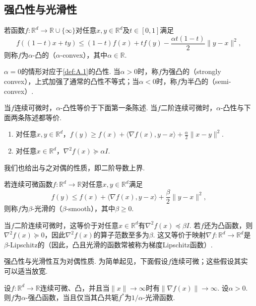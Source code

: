 \subsection{强凸性与光滑性}\label{sec:A.2}

\begin{definition}\label{def:A.7}
若函数$f:\mathbb R^d\to\mathbb R\cup\{\infty\}$对任意$x,y\in\mathbb R^d$及$t\in[0,1]$满足
$$
f((1-t)x+ty)\leq(1-t)f(x)+tf(y)-\frac{\alpha t(1-t)}2\|y-x\|^2,
$$
则称$f$为$\alpha$-凸的（$\alpha$-convex），其中$\alpha\in\mathbb R$.
\end{definition}
$\alpha=0$的情形对应于\autoref{def:A.1}的凸性. 当$\alpha>0$时，称$f$为强凸的（strongly convex），上式加强了通常的凸性不等式；当$\alpha<0$时，称$f$为半凸的（semi-convex）.

当$f$连续可微时，$\alpha$-凸性等价于下面第一条陈述. 当$f$二阶连续可微时，$\alpha$-凸性与下面两条陈述都等价.
\begin{enumerate}
\item 对任意$x,y\in\mathbb R^d$，$f(y)\geq f(x)+\langle\nabla f(x),y-x\rangle+\frac\alpha2\|x-y\|^2$.
\item 对任意$x\in\mathbb R^d$，$\nabla^2f(x)\succeq\alpha I$.
\end{enumerate}
我们也给出与之对偶的性质，即二阶导数上界.

\begin{definition}\label{def:A.8}
若连续可微函数$f:\mathbb R^d\to\mathbb R$对任意$x,y\in\mathbb R^d$满足
$$
f(y)\leq f(x)+\langle\nabla f(x),y-x\rangle+\frac\beta2\|y-x\|^2,
$$
则称$f$为$\beta$-光滑的（$\beta$-smooth），其中$\beta\geq0$.
\end{definition}

当$f$二阶连续可微时，这等价于对任意$x\in\mathbb R^d$有$\nabla^2f(x)\preceq\beta I$. 若$f$还为凸函数，则$\nabla^2f(x)\succeq0$，因此$\nabla^2f(x)$的算子范数至多为$\beta$. 这又等价于映射$\nabla f:\mathbb R^d\to\mathbb R^d$是$\beta$-Lipschitz的（因此，凸且光滑的函数常被称为梯度Lipschitz函数）.

强凸性与光滑性互为对偶性质. 为简单起见，下面假设$f$连续可微；这些假设其实可以适当放宽.

\begin{lemma}\label{lem:A.9}
设$f:\mathbb R^d\to\mathbb R$连续可微、凸，并且当$\|x\|\to\infty$时有$\|\nabla f(x)\|\to\infty$. 设$\alpha>0$. 则$f$为$\alpha$-强凸函数，当且仅当其凸共轭$f^*$为$1/\alpha$-光滑函数.
\end{lemma}

